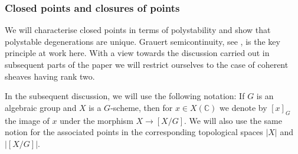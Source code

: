 \subsubsection{Closed points and closures of points} We will characterise closed points in terms of polystability and show that polystable degenerations are unique. Grauert semicontinuity, see \cite[Prop.\,III.12.8]{Hartshorne}, is the key principle at work here. With a view towards the discussion carried out in subsequent parts of the paper we will restrict ourselves to the case of coherent sheaves having rank two.

In the subsequent discussion, we will use the following notation: If $G$ is an algebraic group and $X$ is a $G$-scheme, then for $x \in X(\mathbb{C})$ we denote by $[x]_G$ the image of $x$ under the morphism $X \to [X/G]$. We will also use the same notion for the associated points in the corresponding topological spaces $|X|$ and $|[X / G]|$.

